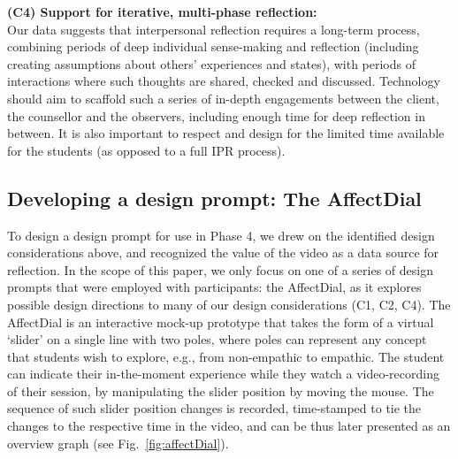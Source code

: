 \documentclass{sigchi}
\begin{document}
{\bf (C4) Support for iterative, multi-phase reflection:}\\ Our data suggests that interpersonal reflection requires a long-term process, combining periods of deep individual sense-making and reflection (including creating assumptions about others' experiences and states), with periods of interactions where such thoughts are shared, checked and discussed. Technology should aim to scaffold such a series of in-depth engagements between the client, the counsellor and the observers, including enough time for deep reflection in between. It is also important to respect and design for the limited time available for the students (as opposed to a full IPR process).   

\enlargethispage{\baselineskip}
\subsection{Developing a design prompt: The AffectDial}
To design a design prompt for use in Phase 4, we drew on the identified design considerations above, and recognized the value of the video as a data source for reflection. In the scope of this paper, we only focus on one of a series of design prompts that were employed with participants: the AffectDial, as it explores possible design directions to many of our design considerations (C1, C2, C4).
%
The AffectDial is an interactive mock-up prototype that takes the form of a virtual `slider' on a single line with two poles, where poles can represent any concept that students wish to explore, e.g., from non-empathic to empathic. The student can indicate their in-the-moment experience while they watch a video-recording of their session, by manipulating the slider position by moving the mouse. The sequence of such slider position changes is recorded, time-stamped to tie the changes to the respective time in the video, and can be thus later presented as an overview graph (see Fig.~\ref{fig:affectDial}). 
\end{document}
